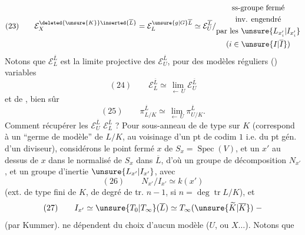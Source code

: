 \[
(23)\qquad
\mathcal E_X^{\deleted{\unsure{K}}\inserted{\overline L}}
=\mathcal E_L^{\unsure{g|G}\overline L}
\simeq\mathcal E_U^{\overline L}/\begin{gathered}\text{ss-groupe fermé}\\\text{inv. engendré}\\\text{par les }\unsure{L_{x_i'}|I_{x_i'}}\\(i\in\unsure{I|\overline I})\end{gathered}
\]
Notons que $\mathcal E_L^{\overline L}$ est la limite projective des $\mathcal E_U^{\overline L}$, pour des modèles réguliers () variables
\[
(24)\qquad\mathcal E_L^{\overline L}\simeq\lim_{\longleftarrow\,U}\mathcal E_U^{\overline L}
\]
et de , bien sûr
\[
(25)\qquad\pi_{L/K}^{\overline L}\simeq\lim_{\longleftarrow\,U}\pi_{U/K}^{\overline L}.
\]
Comment récupérer les $\mathcal E_U^{\overline L}$  $\mathcal E_L^{\overline L}$ ? Pour \uline{} sous-anneau  de  de type  sur $K$ (correspond à un ``germe de modèle'' de $L/K$, au voisinage d'un pt de codim $1$ i.e. du pt gén. d'un diviseur), considérons le point fermé $x$ de $S_x=\operatorname{Spec}(V)$,
et un $x'$ au dessus de $x$ dans le normalisé de $S_x$ dans $\overline L$, d'où un groupe de décomposition $N_{x'}$, et un groupe d'inertie $\unsure{L_{x'}|I_{x'}}$, avec
\[
(26)\qquad N_{x'}/I_{x'}\simeq k(x')
\]
(ext. de type fini de $K$, de degré de tr. $n-1$, si $n=\deg\operatorname{tr}L/K$), et
\[
(27)\qquad I_{x'}\simeq\unsure{T_0|T_\infty}(\overline L)\simeq T_\infty(\unsure{\widetilde K|\overline K})\;-
\]
(par Kummer).   ne dépendent du choix d'aucun  modèle ($U$, ou $X\ldots$). Notons que
